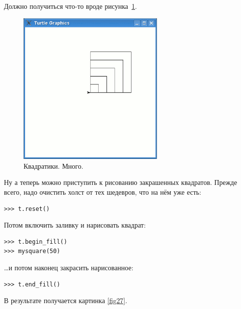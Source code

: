 Должно получиться что-то вроде рисунка \ref{fig26}.

\begin{figure}
\begin{center}
\includegraphics[width=72mm]{../en/figure26.eps}
\end{center}
\caption{Квадратики. Много.}\label{fig26}
\end{figure}

Ну а теперь можно приступить к рисованию закрашенных квадратов. Прежде всего, надо очистить холст от тех шедевров, что на нём уже есть:

\begin{listing}
\begin{verbatim}
>>> t.reset()
\end{verbatim}
\end{listing}

Потом включить заливку и нарисовать квадрат:

\begin{listing}
\begin{verbatim}
>>> t.begin_fill()
>>> mysquare(50)
\end{verbatim}
\end{listing}

…и потом наконец закрасить нарисованное:

\begin{listing}
\begin{verbatim}
>>> t.end_fill()
\end{verbatim}
\end{listing}

В результате получается картинка \ref{fig27}.

